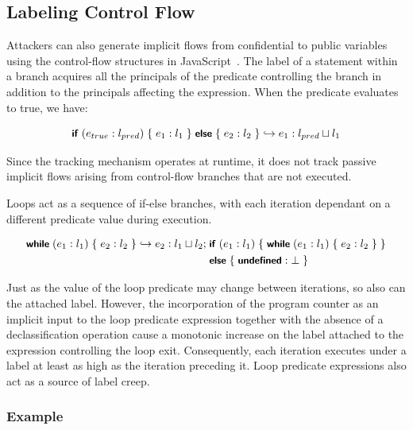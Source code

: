 \subsection{Labeling Control Flow}

Attackers can also generate implicit flows from confidential to public variables using the control-flow structures in JavaScript~\cite[p.~135]{guha.etal+10}.
The label of a statement within a branch acquires all the principals of the predicate controlling the branch in addition to the principals affecting the expression.
When the predicate evaluates to true, we have:

\newcommand{\kw}[1]{\text{\small\textsf{\textbf{#1}}}}

\begin{equation}
  \kw{if}\;(e_{true}:l_{pred})\;\{\;e_1:l_1\;\}\;\kw{else}\;\{\;e_2:l_2\;\} \hookrightarrow e_1:l_{pred} \sqcup l_1
\end{equation}

Since the tracking mechanism operates at runtime, it does not track passive implicit flows arising from control-flow branches that are not executed.

Loops act as a sequence of if-else branches, with each iteration dependant on a different predicate value during execution.

\begin{equation}
\begin{split}
  \kw{while}\;(e_1:l_1)\;\{\;e_2:l_2\;\} \hookrightarrow
  e_2:l_1 \sqcup l_2 ;\; &\kw{if}\;(e_1:l_1)\;\{\;
  \kw{while}\;(e_1:l_1)\;\{\;e_2:l_2\;\}\;\}  \\
  &\kw{else}\;\{\;\kw{undefined}:\bot\;\}
\end{split}
\end{equation}

Just as the value of the loop predicate may change between iterations, so also can the attached label.
However, the incorporation of the program counter as an implicit input to the loop predicate expression together with the absence of a declassification operation cause a monotonic increase on the label attached to the expression controlling the loop exit.
Consequently, each iteration executes under a label at least as high as the iteration preceding it.
Loop predicate expressions also act as a source of label creep.

\subsubsection{Example}

